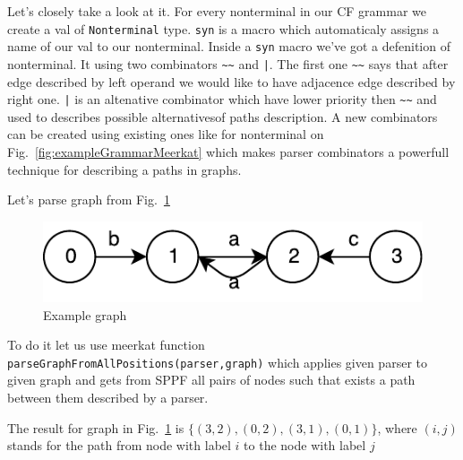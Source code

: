 Let's closely take a look at it. For every nonterminal in our CF grammar we create a val of  \lstinline{Nonterminal} type. \lstinline{syn} is a macro which automaticaly assigns a name of our val to our nonterminal. Inside a \lstinline{syn} macro we've got a defenition of nonterminal. It using two combinators \lstinline{~~} and \lstinline{|}. The first one \lstinline{~~} says that after edge described by left operand we would like to have adjacence edge described by right one. \lstinline{|} is an altenative combinator which have lower priority then \lstinline{~~} and used to describes possible alternativesof paths description. A new combinators can be created using existing ones like for nonterminal on Fig.~\ref{fig:exampleGrammarMeerkat} which makes parser combinators a powerfull technique for describing a paths in graphs.


Let's parse graph from Fig.~\ref{fig:graph}

\begin{figure}[h]
\includegraphics{graph}
\caption{Example graph}
\label{fig:graph}
\end{figure}

To do it let us use meerkat function \lstinline{parseGraphFromAllPositions(parser,graph)} which applies given parser to given graph and gets from SPPF all pairs of nodes such that exists a path between them described by a parser.

The result for graph in Fig.~\ref{fig:graph} is $\{(3,2), (0,2), (3,1), (0,1)\}$, where $(i,j)$ stands for the path from node with label $i$ to the node with label $j$


